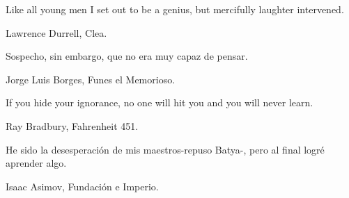 \texttt{}  
\vfill
\epigraph{Like  all young  men  I set out to be  a  genius, but mercifully  laughter  intervened.}{Lawrence Durrell, Clea.}

\texttt{}  
\vfill
\epigraph{Sospecho, sin embargo, que no era muy capaz de pensar.}{Jorge Luis Borges, Funes el Memorioso.}

\texttt{}  
\vfill
\epigraph{If you hide your ignorance, no one will hit you and you will never learn.}{Ray Bradbury, Fahrenheit 451.}

\texttt{}  
\vfill
\epigraph{He sido la desesperación de mis maestros-repuso Batya-, pero al final logré aprender algo.}{Isaac Asimov, Fundación e Imperio.}
